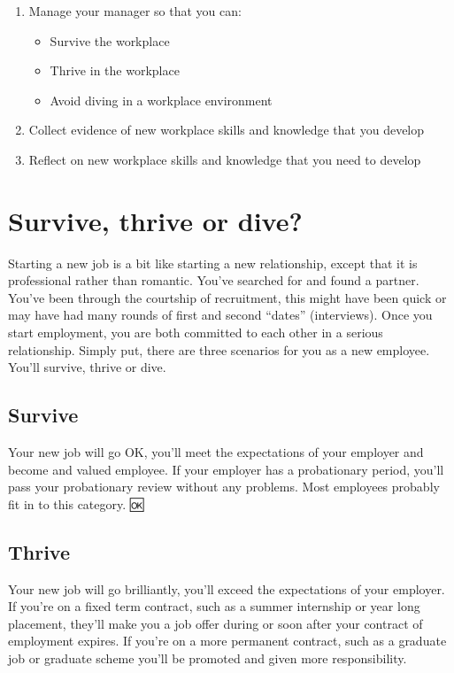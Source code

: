 \documentclass[
]{book}
\providecommand{\tightlist}{%
  \setlength{\itemsep}{0pt}\setlength{\parskip}{0pt}}
\begin{document}
\begin{enumerate}
\def\labelenumi{\arabic{enumi}.}
\tightlist
\item
  Manage your manager so that you can:

  \begin{itemize}
  \tightlist
  \item
    Survive the workplace
  \item
    Thrive in the workplace
  \item
    Avoid diving in a workplace environment
  \end{itemize}
\item
  Collect evidence of new workplace skills and knowledge that you develop
\item
  Reflect on new workplace skills and knowledge that you need to develop
\end{enumerate}

\hypertarget{scenarios}{%
\section{Survive, thrive or dive?}\label{scenarios}}

Starting a new job is a bit like starting a new relationship, except that it is professional rather than romantic. You've searched for and found a partner. You've been through the courtship of recruitment, this might have been quick or may have had many rounds of first and second ``dates'' (interviews). Once you start employment, you are both committed to each other in a serious relationship. Simply put, there are three scenarios for you as a new employee. You'll survive, thrive or dive.

\hypertarget{survive}{%
\subsection{Survive}\label{survive}}

Your new job will go OK, you'll meet the expectations of your employer and become and valued employee. If your employer has a probationary period, you'll pass your probationary review without any problems. Most employees probably fit in to this category. 🆗

\hypertarget{thrive}{%
\subsection{Thrive}\label{thrive}}

Your new job will go brilliantly, you'll exceed the expectations of your employer. If you're on a fixed term contract, such as a summer internship or year long placement, they'll make you a job offer during or soon after your contract of employment expires. If you're on a more permanent contract, such as a graduate job or graduate scheme you'll be promoted and given more responsibility. 💪
\end{document}
